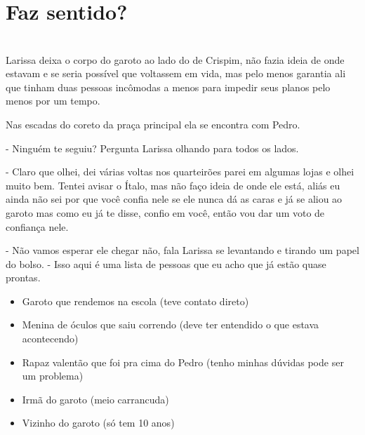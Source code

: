 
    



\newpage


\ifdefined\useChapters
\chapter{Faz sentido?}

\else
\chapter{}
\fi

Larissa deixa o corpo do garoto ao lado do de Crispim, não fazia ideia de onde estavam e se seria possível que voltassem em vida, mas pelo menos garantia ali que tinham duas pessoas incômodas a menos para impedir seus planos pelo menos por um tempo.

Nas escadas do coreto da praça principal ela se encontra com Pedro.

- Ninguém te seguiu? Pergunta Larissa olhando para todos os lados.

- Claro que olhei, dei várias voltas nos quarteirões parei em algumas lojas e olhei muito bem.  Tentei avisar o Ítalo, mas não faço ideia de onde ele está, aliás eu ainda não sei por que você confia nele se ele nunca dá as caras e já se aliou ao garoto mas como eu já te disse, confio em você, então vou dar um voto de confiança nele.

- Não vamos esperar ele chegar não, fala Larissa se levantando e tirando um papel do bolso. - Isso aqui é uma lista de pessoas que eu acho que já estão quase prontas.

\begin{itemize}
	\item Garoto que rendemos na escola (teve contato direto)
	\item Menina de óculos que saiu correndo (deve ter entendido o que estava acontecendo)
	\item Rapaz valentão que foi pra cima do Pedro (tenho minhas dúvidas pode ser um problema)
	\item Irmã do garoto (meio carrancuda)
	\item Vizinho do garoto (só tem 10 anos)
\end{itemize}

